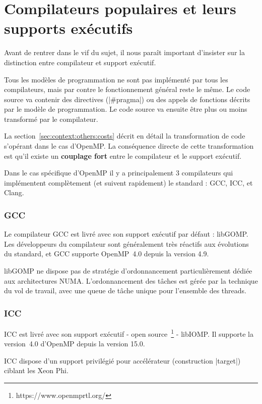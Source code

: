 \section{Compilateurs populaires et leurs supports exécutifs}\label{sec:rw:compilers}


Avant de rentrer dans le vif du sujet, il nous paraît important d'insister sur la distinction entre compilateur et support exécutif.

Tous les modèles de programmation ne sont pas implémenté par tous les compilateurs, mais par contre le fonctionnement général reste le même.
Le code source va contenir des directives (|#pragma|) ou des appels de fonctions décrits par le modèle de programmation. Le code source va ensuite être plus ou moins transformé par le compilateur.

La section~\ref{sec:context:others:costs} décrit en détail la transformation de code s'opérant dans le cas d'OpenMP.
La conséquence directe de cette transformation est qu'il existe un \textbf{couplage fort} entre le compilateur et le support exécutif.

Dans le cas spécifique d'OpenMP il y a principalement 3 compilateurs qui implémentent complètement (et suivent rapidement) le standard : GCC, ICC, et Clang.


\subsubsection{GCC}

Le compilateur GCC est livré avec son support exécutif par défaut : libGOMP.
Les développeurs du compilateur sont généralement très réactifs aux évolutions du standard, et GCC supporte OpenMP~4.0 depuis la version 4.9.

libGOMP ne dispose pas de stratégie d'ordonnancement particulièrement dédiée aux architectures NUMA.
L'ordonnancement des tâches est gérée par la technique du vol de travail, avec une queue de tâche unique pour l'ensemble des threads.



\subsubsection{ICC}


ICC est livré avec son support exécutif - open source~\footnote{https://www.openmprtl.org/} - libIOMP.
Il supporte la version~4.0 d'OpenMP depuis la version 15.0.

ICC dispose d'un support privilégié pour accélérateur (construction |target|) ciblant les Xeon Phi.


